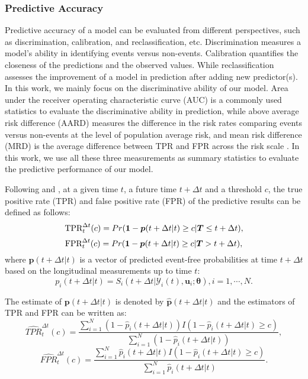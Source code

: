 \subsubsection{Predictive Accuracy}\label{bak_pre_acc}
Predictive accuracy of a model can be evaluated from different perspectives, such as discrimination, calibration, and reclassification, etc. Discrimination measures a model's ability in identifying events versus non-events. Calibration quantifies the closeness of the predictions and the observed values. While reclassification assesses the improvement of a model in prediction after adding new predictor(s). In this work, we mainly focus on the discriminative ability of our model. Area under the receiver operating characteristic curve (AUC) is a commonly used statistics to evaluate the discriminative ability in prediction, while above average risk difference (AARD) measures the difference in the risk rates comparing events versus non-events at the level of population average risk, and mean risk difference (MRD) is the average difference between TPR and FPR across the risk scale \citep{pepe2008comments}. In this work, we use all these three measurements as summary statistics to evaluate the predictive performance of our model.

Following \cite{zheng2013adopting} and \cite{yang2015prediction}, at a given time $t$, a future time $t+\Delta t$ and a threshold $c$, the true positive rate (TPR) and false positive rate (FPR) of the predictive results can be defined as follows:
\[\mbox{TPR}_t^{\Delta t}(c)=Pr({\bf 1} - \boldsymbol{p}(t+\Delta t|t)\ge c | \boldsymbol{T}\le t+\Delta t),\]
\[\mbox{FPR}_t^{\Delta t}(c)=Pr({\bf 1} -\boldsymbol{p}(t+\Delta t|t)\ge c | \boldsymbol{T} > t+\Delta t),\]
where $\boldsymbol{p}(t+\Delta t | t)$ is a vector of predicted event-free probabilities at time $t+\Delta t$ based on the longitudinal measurements up to time $t$:
\[p_i(t+\Delta t | t) = S_i(t+\Delta t| \mathcal{Y}_{i}(t), {\boldsymbol u}_i;\boldsymbol{\theta}), i = 1, \cdots, N.\]

The estimate of $\boldsymbol{p}(t+\Delta t | t)$ is denoted by $\hat{\boldsymbol{p}}(t+\Delta t | t)$ and the estimators of TPR and FPR can be written as:
\begin{equation*}\label{bak_est_pTPR}
\widehat{TPR}_{t}^{\Delta t}(c) = \frac{\sum_{i=1}^{N}(1 -\hat{p}_i(t+\Delta t|t))I(1 -\hat{p}_i(t+\Delta t|t)\ge c)}{\sum_{i=1}^{N}(1 - \hat{p}_i(t+\Delta t|t))},
\end{equation*}
\begin{equation*}\label{bak_est_pFPR}
\widehat{FPR}_{t}^{\Delta t}(c) = \frac{\sum_{i=1}^{N}\hat{p}_i(t+\Delta t|t)I(1 -\hat{p}_i(t+\Delta t|t)\ge c)}{\sum_{i=1}^{N}\hat{p}_i(t+\Delta t|t)}.
\end{equation*}


